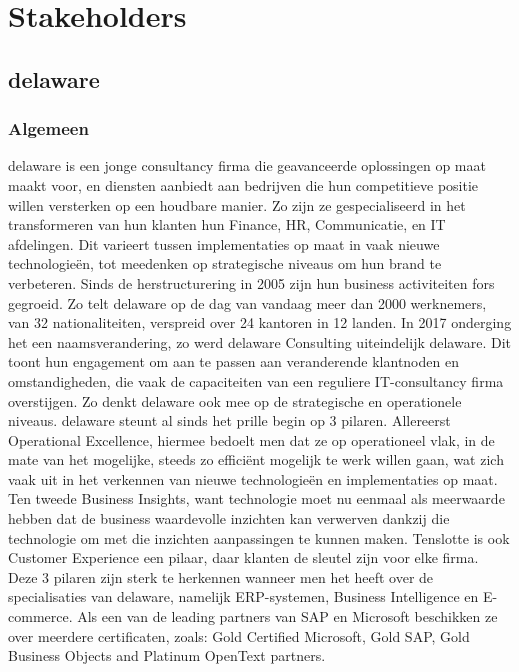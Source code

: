 
\chapter{Stakeholders}
\label{ch:stakeholders}


\section{delaware}
\subsection{Algemeen}
delaware is een jonge consultancy firma die geavanceerde oplossingen op maat maakt voor, en diensten aanbiedt aan bedrijven die hun competitieve positie willen versterken op een houdbare manier. Zo zijn ze gespecialiseerd in het transformeren van hun klanten hun Finance, HR, Communicatie, en IT afdelingen. Dit varieert tussen implementaties op maat in vaak nieuwe technologieën, tot meedenken op strategische niveaus om hun brand te verbeteren. 
Sinds de herstructurering in 2005 zijn hun business activiteiten fors gegroeid. Zo telt delaware op de dag van vandaag meer dan 2000 werknemers, van 32 nationaliteiten, verspreid over 24 kantoren in 12 landen. In 2017 onderging het een naamsverandering, zo werd delaware Consulting uiteindelijk delaware. Dit toont hun engagement om aan te passen aan veranderende klantnoden en omstandigheden, die vaak de capaciteiten van een reguliere IT-consultancy firma overstijgen. Zo denkt delaware ook mee op de strategische en operationele niveaus.  
delaware steunt al sinds het prille begin op 3 pilaren. Allereerst Operational Excellence, hiermee bedoelt men dat ze op operationeel vlak, in de mate van het mogelijke, steeds zo efficiënt mogelijk te werk willen gaan, wat zich vaak uit in het verkennen van nieuwe technologieën en implementaties op maat. Ten tweede Business Insights, want technologie moet nu eenmaal als meerwaarde hebben dat de business waardevolle inzichten kan verwerven dankzij die technologie om met die inzichten aanpassingen te kunnen maken. Tenslotte is ook Customer Experience een pilaar, daar klanten de sleutel zijn voor elke firma. Deze 3 pilaren zijn sterk te herkennen wanneer men het heeft over de specialisaties van delaware, namelijk ERP-systemen, Business Intelligence en E-commerce. 
Als een van de leading partners van SAP en Microsoft beschikken ze over meerdere certificaten, zoals: Gold Certified Microsoft, Gold SAP, Gold Business Objects and Platinum OpenText partners.


